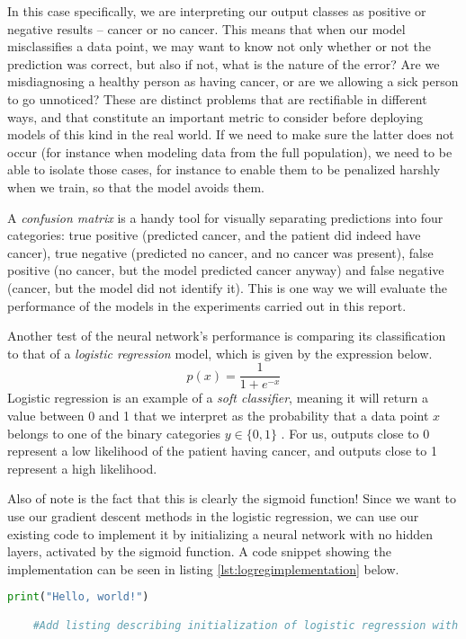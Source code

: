 In this case specifically, we are interpreting our output classes as positive or negative results -- cancer or no cancer. This means that when our model misclassifies a data point, we may want to know not only whether or not the prediction was correct, but also if not, what is the nature of the error? Are we misdiagnosing a healthy person as having cancer, or are we allowing a sick person to go unnoticed? These are distinct problems that are rectifiable in different ways, and that constitute an important metric to consider before deploying models of this kind in the real world. If we need to make sure the latter does not occur (for instance when modeling data from the full population), we need to be able to isolate those cases, for instance to enable them to be penalized harshly when we train, so that the model avoids them. 

A \emph{confusion matrix} is a handy tool for visually separating predictions into four categories: true positive (predicted cancer, and the patient did indeed have cancer), true negative (predicted no cancer, and no cancer was present), false positive (no cancer, but the model predicted cancer anyway) and false negative (cancer, but the model did not identify it). This is one way we will evaluate the performance of the models in the experiments carried out in this report.

Another test of the neural network's performance is comparing its classification to that of a \emph{logistic regression} model, which is given by the expression below.
\[p(x) = \frac{1}{1 + e^{-x}}\]
Logistic regression is an example of a \emph{soft classifier}, meaning it will return a value between 0 and 1 that we interpret as the probability that a data point $x$ belongs to one of the binary categories $y \in \{0,1\}$ \cite{MHJlogisticregression}. For us, outputs close to 0 represent a low likelihood of the patient having cancer, and outputs close to 1 represent a high likelihood.

Also of note is the fact that this is clearly the sigmoid function! Since we want to use our gradient descent methods in the logistic regression, we can use our existing code to implement it by initializing a neural network with no hidden layers, activated by the sigmoid function. A code snippet showing the implementation can be seen in listing \ref{lst:logregimplementation} below.

\begin{lstlisting}[language=Python, label={lst:logregimplementation}, caption=Initialization of logistic regression as a single-layer neural network activated by the sigmoid function.]
    print("Hello, world!")

    #Add listing describing initialization of logistic regression with neural network code.
\end{lstlisting}

